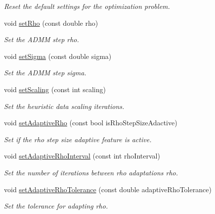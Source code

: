 \begin{DoxyCompactItemize}
\begin{DoxyCompactList}\small\item\em Reset the default settings for the optimization problem. \end{DoxyCompactList}\item 
void \hyperlink{classOSQPWrapper_1_1OptimizerSettings_acf6b69c1ea0033a2e34ddc919224d875}{set\+Rho} (const double rho)
\begin{DoxyCompactList}\small\item\em Set the A\+D\+MM step rho. \end{DoxyCompactList}\item 
void \hyperlink{classOSQPWrapper_1_1OptimizerSettings_abd3ee47898bda12e35cfd86deea63559}{set\+Sigma} (const double sigma)
\begin{DoxyCompactList}\small\item\em Set the A\+D\+MM step sigma. \end{DoxyCompactList}\item 
void \hyperlink{classOSQPWrapper_1_1OptimizerSettings_a44817e949ec8cd19050560240783ab8c}{set\+Scaling} (const int scaling)
\begin{DoxyCompactList}\small\item\em Set the heuristic data scaling iterations. \end{DoxyCompactList}\item 
void \hyperlink{classOSQPWrapper_1_1OptimizerSettings_aae418d419de486492833c441dc5aef94}{set\+Adaptive\+Rho} (const bool is\+Rho\+Step\+Size\+Adactive)
\begin{DoxyCompactList}\small\item\em Set if the rho step size adaptive feature is active. \end{DoxyCompactList}\item 
void \hyperlink{classOSQPWrapper_1_1OptimizerSettings_adeeabf389793a6dd70a7cebb540a0fe7}{set\+Adaptive\+Rho\+Interval} (const int rho\+Interval)
\begin{DoxyCompactList}\small\item\em Set the number of iterations between rho adaptations rho. \end{DoxyCompactList}\item 
void \hyperlink{classOSQPWrapper_1_1OptimizerSettings_a22e454dea4b916c7c8fe71af59779953}{set\+Adaptive\+Rho\+Tolerance} (const double adaptive\+Rho\+Tolerance)
\begin{DoxyCompactList}\small\item\em Set the tolerance for adapting rho. \end{DoxyCompactList}\item 

\end{DoxyCompactItemize}
